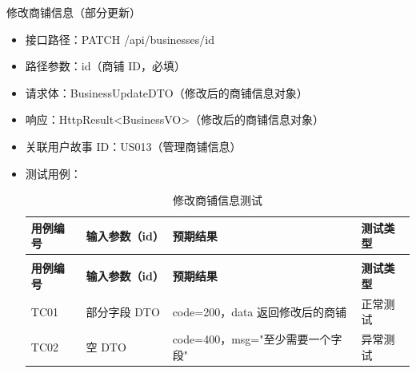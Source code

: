 \begin{levellist}
\begin{levellist}
        \item 修改商铺信息（部分更新）
        \begin{itemize}
            \item 接口路径：PATCH /api/businesses/{id}
            \item 路径参数：id（商铺 ID，必填）
            \item 请求体：BusinessUpdateDTO（修改后的商铺信息对象）
            \item 响应：HttpResult<BusinessVO>（修改后的商铺信息对象）
            \item 关联用户故事 ID：US013（管理商铺信息）
            \item 测试用例：
                  \begin{longtable}{>{\centering\arraybackslash}m{2cm} >{\centering\arraybackslash}m{4cm} >{\centering\arraybackslash}m{5cm} >{\centering\arraybackslash}m{2cm}}

                      \caption{修改商铺信息测试} \label{tab:training}                                     \\

                      \toprule
                      \textbf{用例编号} & \textbf{输入参数（id）} & \textbf{预期结果}           & \textbf{测试类型} \\
                      \midrule
                      \endfirsthead

                      \multicolumn{4}{c}{{\tablename\ \thetable{} 续表}}                            \\
                      \toprule
                      \textbf{用例编号} & \textbf{输入参数（id）} & \textbf{预期结果}           & \textbf{测试类型} \\
                      \midrule
                      \endhead

                      \bottomrule
                      \endfoot

                      TC01          & 部分字段 DTO          & code=200，data 返回修改后的商铺  & 正常测试          \\
                      TC02          & 空 DTO             & code=400，msg="至少需要一个字段" & 异常测试          \\
                  \end{longtable}
        \end{itemize}


\end{levellist}
\end{levellist}
